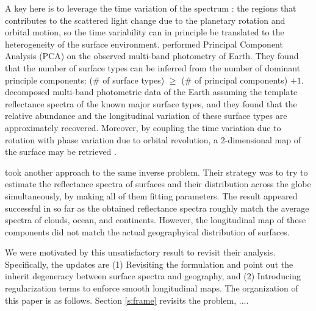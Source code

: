 \documentclass[iop,numberedappendix,apj,]{emulateapj}
\begin{document}
A key here is to leverage the time variation of the spectrum \citep{Ford2001}: the regions that contributes to the scattered light change due to the planetary rotation and  orbital motion, so the time variability can in principle be translated to the heterogeneity of the surface environment.  
\citet{Cowan2009, Cowan2011} performed Principal Component Analysis (PCA) on the observed multi-band photometry of Earth. They found that the number of surface types can be inferred from the number of dominant principle components: (\# of surface types) $\ge $ (\# of principal components) $+ 1$. %
\citet{Fujii2010, Fujii2011} decomposed multi-band photometric data of the Earth assuming the template reflectance spectra of the known major surface types, and they found that the relative abundance and the longitudinal variation of these surface types are approximately recovered. 
Moreover, by coupling the time variation due to rotation with phase variation due to orbital revolution, a 2-dimensional map of the surface may be retrieved \citep{Kawahara2010, Kawahara2011, Fujii2012}. 

\citet{Cowan2013} took another approach to the same inverse problem. 
Their strategy was to try to estimate the reflectance spectra of surfaces and their distribution across the globe simultaneously, by making all of them fitting parameters. 
The result appeared successful in so far as the obtained reflectance spectra roughly match the average spectra of clouds, ocean, and continents. 
However, the longitudinal map of these components did not match the actual geographyical distribution of surfaces. 

We were motivated by this unsatisfactory result to revisit their analysis. 
Specifically, the updates are (1) Revisiting the formulation and point out the inherit degeneracy between surface spectra and geography, and (2) Introducing regularization terms to enforce smooth longitudinal maps. 
The organization of this paper is as follows. 
Section \ref{s:frame} revisits the problem, ....

\end{document}
